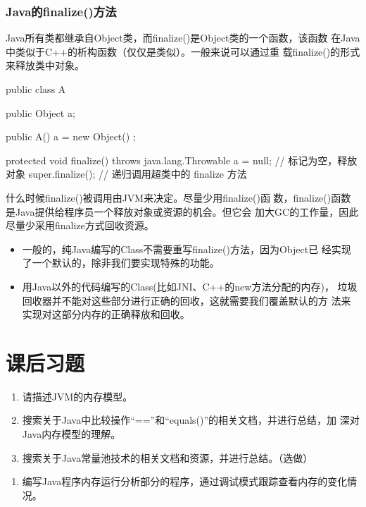 \subsubsection{Java的finalize()方法}

Java所有类都继承自Object类，而finalize()是Object类的一个函数，该函数
在Java中类似于C++的析构函数（仅仅是类似）。一般来说可以通过重
载finalize()的形式来释放类中对象。

\begin{javaCode}
  public class A { 
    public Object a; 

    public A() { 
      a = new Object() ;
    } 
    
    protected void finalize() throws java.lang.Throwable { 
      a = null; // 标记为空，释放对象 
      super.finalize(); // 递归调用超类中的 finalize 方法
    }
  } 
\end{javaCode}

什么时候finalize()被调用由JVM来决定。{\hei\Blue 尽量少用finalize()函
  数，finalize()函数是Java提供给程序员一个释放对象或资源的机会。但它会
  加大GC的工作量，因此尽量少采用finalize方式回收资源。}

\begin{itemize}
\item 一般的，纯Java编写的Class不需要重写finalize()方法，因为Object已
  经实现了一个默认的，除非我们要实现特殊的功能。
\item 用Java以外的代码编写的Class(比如JNI、C++的new方法分配的内存)，
  垃圾回收器并不能对这些部分进行正确的回收，这就需要我们覆盖默认的方
  法来实现对这部分内存的正确释放和回收。
\end{itemize}

\section{课后习题}


\begin{enumerate}
\item 请描述JVM的内存模型。
\item 搜索关于Java中比较操作“==”和“equals()”的相关文档，并进行总结，加
  深对Java内存模型的理解。
\item 搜索关于Java常量池技术的相关文档和资源，并进行总结。（选做）
\end{enumerate}


\begin{enumerate}
\item 编写Java程序内存运行分析部分的程序，通过调试模式跟踪查看内存的变化情况。
\end{enumerate}